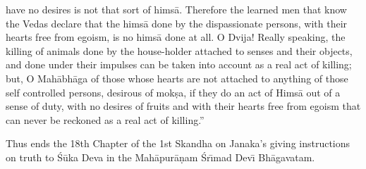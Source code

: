 have no desires is not that sort of hims\=a. Therefore the learned men that know the Vedas declare that the hims\=a done by the dispassionate persons, with their hearts free from egoism, is no hims\=a done at all. O Dvija! Really speaking, the killing of animals done by the house-holder attached to senses and their objects, and done under their impulses can be taken into account as a real act of killing; but, O Mah\=abh\=aga of those whose hearts are not attached to anything of those self controlled persons, desirous of mok\d{s}a, if they do an act of Hims\=a out of a sense of duty, with no desires of fruits and with their hearts free from egoism that can never be reckoned as a real act of killing.''

Thus ends the 18th Chapter of the 1st Skandha on Janaka's giving instructions on truth to \'S\=uka Deva in the Mah\=apur\=a\d{n}am \'Sr\={\i}mad Dev\={\i} Bh\=agavatam.



